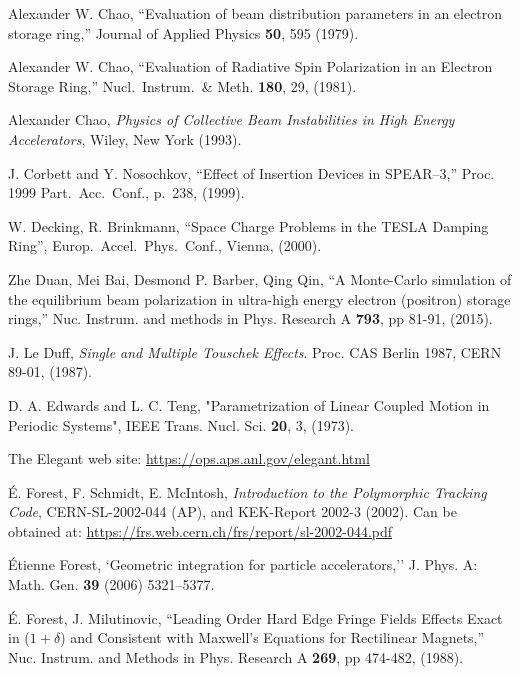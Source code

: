 \begin{thebibliography}{XXXXXXX99}
Alexander W. Chao, 
``Evaluation of beam distribution parameters in an electron storage ring,''
Journal of Applied Physics {\bf 50}, 595 (1979).

Alexander W. Chao, 
``Evaluation of Radiative Spin Polarization in an Electron Storage Ring,''
Nucl.\ Instrum.\ \& Meth. {\bf 180}, 29, (1981).

Alexander Chao, 
{\em Physics of Collective Beam Instabilities in High Energy Accelerators}, 
Wiley, New York (1993). 

J. Corbett and Y. Nosochkov, ``Effect of Insertion Devices in SPEAR--3,''
Proc. 1999 Part.\ Acc.\ Conf., p.~238, (1999).

W. Decking, R. Brinkmann, 
``Space Charge Problems in the TESLA Damping Ring'',
Europ.\ Accel.\ Phys.\ Conf., Vienna, (2000).

Zhe Duan, Mei Bai, Desmond P. Barber, Qing Qin, 
``A Monte-Carlo simulation of the equilibrium beam polarization in ultra-high energy electron
(positron) storage rings,''
Nuc. Instrum. and methods in Phys. Research A {\bf 793}, pp 81-91, (2015).

  J. Le Duff, \emph{Single and Multiple Touschek Effects}.
  Proc. CAS Berlin 1987,
  CERN 89-01, (1987).

D. A. Edwards and L. C. Teng, 
"Parametrization of Linear Coupled Motion in Periodic Systems",
IEEE Trans. Nucl. Sci. {\bf 20}, 3, (1973).

The Elegant web site:
\hfill\break
\hspace*{0.3in} \url{https://ops.aps.anl.gov/elegant.html}

\'E. Forest, F. Schmidt, E. McIntosh, 
{\it Introduction to the Polymorphic Tracking Code}, 
CERN-SL-2002-044 (AP), and KEK-Report 2002-3 (2002). 
Can be obtained at:
\hfill\break
\hspace*{0.3in}
\url{https://frs.web.cern.ch/frs/report/sl-2002-044.pdf}

\'Etienne Forest, `Geometric integration for particle accelerators,''
J. Phys. A: Math. Gen. {\bf 39} (2006) 5321–5377.

\'E. Forest, J. Milutinovic, 
``Leading Order Hard Edge Fringe Fields Effects Exact in ($1+\delta$) and 
Consistent with Maxwell's Equations for Rectilinear Magnets,''
Nuc. Instrum. and Methods in Phys. Research A {\bf 269}, pp 474-482, (1988).


\end{thebibliography}
